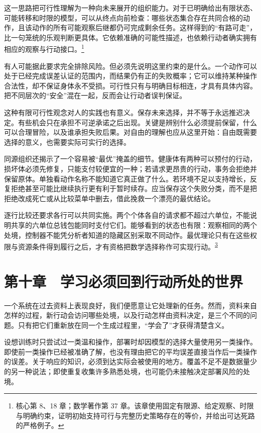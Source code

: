 \documentclass[
  11pt,
  oneside]{book}
\begin{document}
这一思路把可行性理解为一种向未来展开的组织能力。对于已明确给出有限状态、可能转移和时限的模型，可以从终点向前检查：哪些状态集合存在共同合格的动作，且该动作的所有可能观察后继都仍可完成剩余任务。这样得到的``有路可走''，比一句笼统的乐观判断更具体。它依赖准确的可能性描述，也依赖行动者确实拥有相应的观察与行动接口。\footnote{\hypertarget{ph-note-23}{}核心第 8、18 章；数学著作第 37 章。该章使用固定有限源、给定观察、时限与明确约束，证明初始支持可行与完整历史策略存在的等价，并给出可达死路的严格例子。}

有人可能据此要求完全排除风险。但必须先说明这里约束的是什么。一个动作可以处于已经完成误差认证的范围内，而结果仍有正的失败概率；它可以维持某种操作合法性，却不保证身体永不受损。可行性只有与明确目标相连，才具有具体内容。把不同层次的``安全''混在一起，反而会让行动者误判保证。

这种有限可行性观念对人的实践也有意义。保存未来选择，并不等于永远推迟决定。有些机会只在承担不可逆承诺之后出现。关键是辨别什么必须提前保留，什么可以合理冒险，以及谁承担失败后果。对自由的理解也应从这里开始：自由既需要选择的意义，也需要实际可实行的选择。

同源组织还揭示了一个容易被``最优''掩盖的细节。健康体有两种可以预付的行动，损坏体必须先修复，只能支付较便宜的一种；若请求更昂贵的行动，事务会拒绝并保留原体。单独看动作名称不能知道它真正做了什么。若环境不足以支持增长，反复拒绝甚至可能比继续执行更有利于暂时续存。应当保存这个失败分类，而不是把拒绝改成死亡或从比较菜单中删去，借此挽救一个漂亮的最优结论。

\begingroup{}

逐行比较还要求各行可以共同实施。两个个体各自的请求都不超过六单位，不能说明共享的六单位总钱包能同时支付它们。能够看到的状态也有限：观察相同的两个处境，控制器不能凭分析者知道的隐藏区别采取不同动作。最优理论只有在这些权限与资源条件得到履行之后，才有资格把数学选择称作可实现行动。\textsuperscript{\hyperlink{ph-note-3}{3}}

\par\endgroup

\chapter{第十章　学习必须回到行动所处的世界}\label{ph-ch-10}

一个系统在过去资料上表现良好，我们便愿意让它处理新的任务。然而，资料来自怎样的过程，新行动会访问哪些处境，以及行动怎样由资料决定，是三个不同的问题。只有把它们重新放在同一个生成过程里，``学会了''才获得清楚含义。

设想训练时只尝试过一类温和操作，部署时却因模型的选择大量使用另一类操作。即使前一类操作已经被准确了解，也没有理由把它的平均误差直接当作后一类操作的误差。关于响应的知识，必须到达实际会被使用的地方。覆盖不足不是数据量少的另一种说法；即使重复收集许多熟悉处境，也可能仍未接触决定部署风险的处境。
\end{document}
